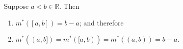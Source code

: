 \documentclass[notoc,notitlepage]{tufte-book}
\begin{document}
\begin{propononum}\label{propo:lom_of_arbitrary_intervals}
  Suppose $a < b \in \mathbb{R}$. Then
  \begin{enumerate}
    \item $m^*([a, b]) = b - a$; and therefore
    \item $m^*((a, b]) = m^*([a, b)) = m^*((a, b)) = b - a$.
  \end{enumerate}
\end{propononum}



\appendix

\backmatter

\fancyhead[LE]{\thepage \enspace \textsl{\leftmark}}



\printindex
\end{document}

